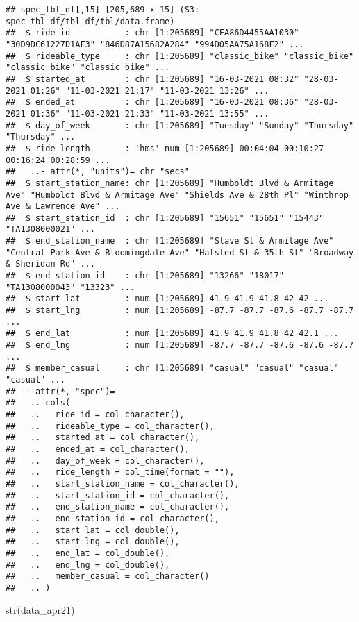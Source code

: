 \documentclass[
]{article}
\newenvironment{Shaded}{\begin{snugshade}}{\end{snugshade}}
\newcommand{\FunctionTok}[1]{\textcolor[rgb]{0.00,0.00,0.00}{#1}}
\newcommand{\NormalTok}[1]{#1}
\begin{document}
\begin{verbatim}
## spec_tbl_df[,15] [205,689 x 15] (S3: spec_tbl_df/tbl_df/tbl/data.frame)
##  $ ride_id           : chr [1:205689] "CFA86D4455AA1030" "30D9DC61227D1AF3" "846D87A15682A284" "994D05AA75A168F2" ...
##  $ rideable_type     : chr [1:205689] "classic_bike" "classic_bike" "classic_bike" "classic_bike" ...
##  $ started_at        : chr [1:205689] "16-03-2021 08:32" "28-03-2021 01:26" "11-03-2021 21:17" "11-03-2021 13:26" ...
##  $ ended_at          : chr [1:205689] "16-03-2021 08:36" "28-03-2021 01:36" "11-03-2021 21:33" "11-03-2021 13:55" ...
##  $ day_of_week       : chr [1:205689] "Tuesday" "Sunday" "Thursday" "Thursday" ...
##  $ ride_length       : 'hms' num [1:205689] 00:04:04 00:10:27 00:16:24 00:28:59 ...
##   ..- attr(*, "units")= chr "secs"
##  $ start_station_name: chr [1:205689] "Humboldt Blvd & Armitage Ave" "Humboldt Blvd & Armitage Ave" "Shields Ave & 28th Pl" "Winthrop Ave & Lawrence Ave" ...
##  $ start_station_id  : chr [1:205689] "15651" "15651" "15443" "TA1308000021" ...
##  $ end_station_name  : chr [1:205689] "Stave St & Armitage Ave" "Central Park Ave & Bloomingdale Ave" "Halsted St & 35th St" "Broadway & Sheridan Rd" ...
##  $ end_station_id    : chr [1:205689] "13266" "18017" "TA1308000043" "13323" ...
##  $ start_lat         : num [1:205689] 41.9 41.9 41.8 42 42 ...
##  $ start_lng         : num [1:205689] -87.7 -87.7 -87.6 -87.7 -87.7 ...
##  $ end_lat           : num [1:205689] 41.9 41.9 41.8 42 42.1 ...
##  $ end_lng           : num [1:205689] -87.7 -87.7 -87.6 -87.6 -87.7 ...
##  $ member_casual     : chr [1:205689] "casual" "casual" "casual" "casual" ...
##  - attr(*, "spec")=
##   .. cols(
##   ..   ride_id = col_character(),
##   ..   rideable_type = col_character(),
##   ..   started_at = col_character(),
##   ..   ended_at = col_character(),
##   ..   day_of_week = col_character(),
##   ..   ride_length = col_time(format = ""),
##   ..   start_station_name = col_character(),
##   ..   start_station_id = col_character(),
##   ..   end_station_name = col_character(),
##   ..   end_station_id = col_character(),
##   ..   start_lat = col_double(),
##   ..   start_lng = col_double(),
##   ..   end_lat = col_double(),
##   ..   end_lng = col_double(),
##   ..   member_casual = col_character()
##   .. )
\end{verbatim}

\begin{Shaded}
\begin{Highlighting}[]
\FunctionTok{str}\NormalTok{(data\_apr21)}
\end{Highlighting}
\end{Shaded}
\end{document}
